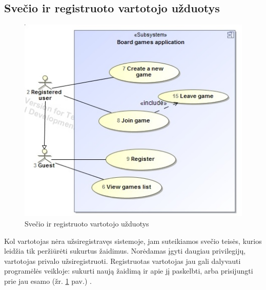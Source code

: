 \documentclass{VUMIFPSkursinis}
\begin{document}
	\subsection{Svečio ir registruoto vartotojo užduotys}
		\begin{figure}[H]
			\centering
			\includegraphics[scale=0.6]{img/UzduociuDiagrama1}
			\caption{Svečio ir registruoto vartotojo užduotys}
			\label{img:UzduociuDiagrama1}
		\end{figure}
		Kol vartotojas nėra užsiregistravęs sistemoje, jam suteikiamos svečio teisės, kurios leidžia tik peržiūrėti sukurtus žaidimus. Norėdamas įgyti daugiau privilegijų, vartotojas privalo užsiregistruoti. Registruotas vartotojas jau gali dalyvauti programėlės veikloje: sukurti naują žaidimą ir apie jį paskelbti, arba prisijungti prie jau esamo (žr. \ref{img:UzduociuDiagrama1} pav.) .
\end{document}
